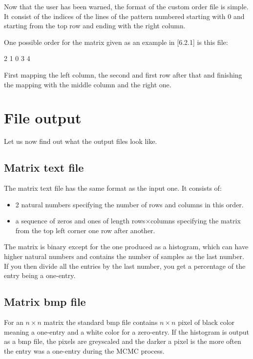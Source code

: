 Now that the user has been warned, the format of the custom order file is simple. It consist of the indices of the lines of the pattern numbered starting with 0 and starting from the top row and ending with the right column.

One possible order for the matrix given as an example in [6.2.1] is this file:
\begin{center}
2 1 0 3 4
\end{center}
First mapping the left column, the second and first row after that and finishing the mapping with the middle column and the right one.

\section{File output}
Let us now find out what the output files look like.

\subsection{Matrix text file}
The matrix text file has the same format as the input one. It consists of:
\begin{itemize}
\item 2 natural numbers specifying the number of rows and columns in this order.
\item a sequence of zeros and ones of length rows$\times$columns specifying the matrix from the top left corner one row after another.
\end{itemize}
The matrix is binary except for the one produced as a histogram, which can have higher natural numbers and contains the number of samples as the last number. If you then divide all the entries by the last number, you get a percentage of the entry being a one-entry.

\subsection{Matrix bmp file}
For an $n\times n$ matrix the standard bmp file contains $n\times n$ pixel of black color meaning a one-entry and a white color for a zero-entry. If the histogram is output as a bmp file, the pixels are greyscaled and the darker a pixel is the more often the entry was a one-entry during the MCMC process.
